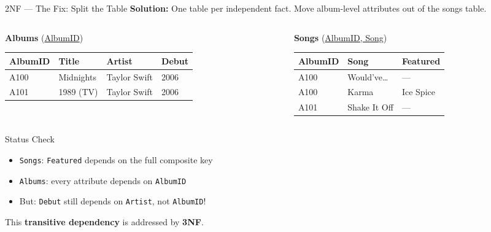 \begin{frame}{2NF --- The Fix: Split the Table}
  \textbf{Solution:} One table per independent fact.  Move album-level attributes
  out of the songs table.

  \vspace{0.5em}
  \begin{columns}[t]
    \begin{column}{0.48\textwidth}
      \textbf{Albums} (\underline{AlbumID})
      \small
      \begin{tabular}{llll}
        \toprule
        \textbf{AlbumID} & \textbf{Title} & \textbf{Artist} & \textbf{Debut} \\
        \midrule
        A100 & Midnights & Taylor Swift & 2006 \\
        A101 & 1989 (TV) & Taylor Swift & 2006 \\
        \bottomrule
      \end{tabular}
    \end{column}
    \begin{column}{0.48\textwidth}
      \textbf{Songs} (\underline{AlbumID, Song})
      \small
      \begin{tabular}{lll}
        \toprule
        \textbf{AlbumID} & \textbf{Song} & \textbf{Featured} \\
        \midrule
        A100 & Would've\ldots & --- \\
        A100 & Karma & Ice Spice \\
        A101 & Shake It Off & --- \\
        \bottomrule
      \end{tabular}
    \end{column}
  \end{columns}

  \vspace{0.6em}
  \begin{block}{Status Check}
    \begin{itemize}
      \item \texttt{Songs}: \texttt{Featured} depends on the full composite key \checkmark
      \item \texttt{Albums}: every attribute depends on \texttt{AlbumID} \checkmark
      \item But: \texttt{Debut} still depends on \texttt{Artist}, not \texttt{AlbumID}!
    \end{itemize}
    This \textbf{transitive dependency} is addressed by \textbf{3NF}.
  \end{block}
\end{frame}
